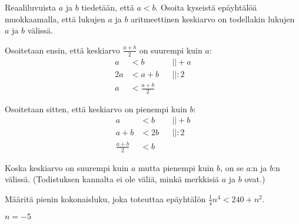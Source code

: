 \begin{tehtava}
Reaaliluvuista $a$ ja $b$ tiedetään, että $a<b$. Osoita kyseistä epäyhtälöä muokkaamalla, että lukujen $a$ ja $b$ aritmeettinen keskiarvo on todellakin lukujen $a$ ja $b$ välissä.
	\begin{vastaus}
	Osoitetaan ensin, että keskiarvo $\frac{a+b}{2}$ on suurempi kuin $a$:
	\begin{align*}
	a&<b && ||+a \\
	2a&<a+b && ||:2 \\
	a&<\frac{a+b}{2} && 
	\end{align*}
	
	Osoitetaan sitten, että keskiarvo on pienempi kuin $b$:
	\begin{align*}
	a&<b && ||+b \\
	a+b&<2b && ||:2 \\
	\frac{a+b}{2}&<b &&
	\end{align*}
	
	Koska keskiarvo on suurempi kuin $a$ mutta pienempi kuin $b$, on se $a$:n ja $b$:n välissä. (Todistuksen kannalta ei ole väliä, minkä merkkisiä $a$ ja $b$ ovat.) 
	\end{vastaus}
\end{tehtava}

\begin{tehtava}
Määritä pienin kokonaisluku, joka toteuttaa epäyhtälön $\frac{1}{4}n^4<240+n^2$.
	\begin{vastaus}
	$n=-5$
	\end{vastaus}
\end{tehtava}

